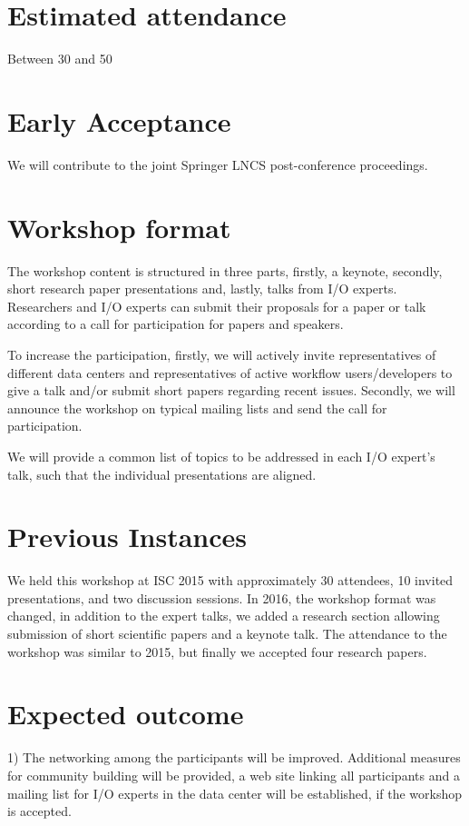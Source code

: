 \documentclass[a4paper,10pt]{article}
\begin{document}
\section{Estimated attendance}
Between 30 and 50

\section{Early Acceptance}

We will contribute to the joint Springer LNCS post-conference proceedings.




\section{Workshop format}
The workshop content is structured in three parts,
firstly, a keynote, secondly, short research paper presentations and, lastly, talks from I/O experts.
Researchers and I/O experts can submit their proposals for a paper or talk according to a call for participation for papers and speakers.

To increase the participation, firstly, we will actively invite representatives of different data centers and representatives of active workflow users/developers to give a talk and/or submit short papers regarding recent issues.
Secondly, we will announce the workshop on typical mailing lists and send the call for participation.

We will provide a common list of topics to be addressed in each I/O expert's talk, such that the individual presentations are aligned.


\section{Previous Instances}
We held this workshop at ISC 2015 with approximately 30 attendees, 10 invited presentations, and two discussion sessions. 
In 2016, the workshop format was changed, in addition to the expert talks, we added a research section allowing submission of short scientific papers and a keynote talk. 
The attendance to the workshop was similar to 2015, but finally we accepted four research papers.


\section{Expected outcome}
1) The networking among the participants will be improved.
Additional measures for community building will be provided, a web site linking all participants and a mailing list for I/O experts in the data center will be established, if the workshop is accepted.
\end{document}
